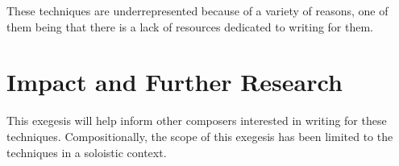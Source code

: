 These techniques are underrepresented because of a variety of reasons, one of them being that there is a lack of resources dedicated to writing for them.

\section{Impact and Further Research}
This exegesis will help inform other composers interested in writing for these techniques. 
Compositionally, the scope of this exegesis has been limited to the techniques in a soloistic context.